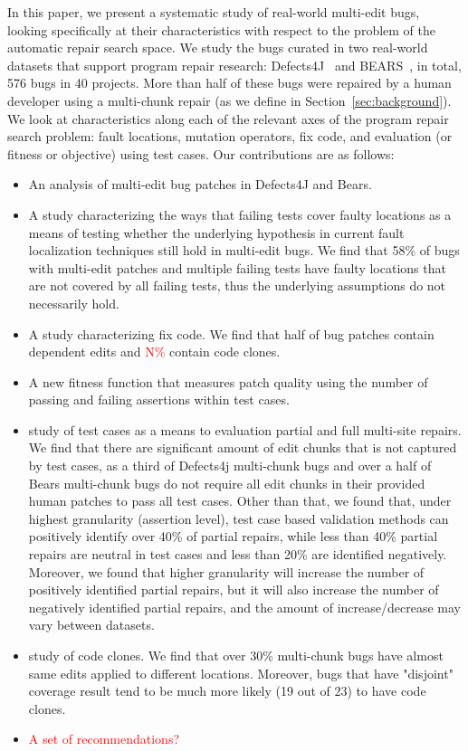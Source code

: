 \documentclass[sigconf, timestamp-false, anonymous=true]{acmart}
\newcommand\todo[1]{\textcolor{red}{#1}}
\begin{document}
In this paper, we present a systematic study of real-world multi-edit bugs,
looking specifically at their characteristics with respect to the problem of the
automatic repair search space.  
We study the bugs curated in two
real-world datasets that support program repair research: Defects4J~\cite{defects4j}
and BEARS~\cite{bears}, in total, 576 bugs in 40 projects. 
More than half of these bugs were repaired by a
human developer using a multi-chunk repair (as we define in
Section~\ref{sec:background}).  We look at characteristics along each of the
relevant axes of the program repair search problem: fault locations, mutation
operators, fix code, and evaluation (or fitness or objective) using test cases.  Our 
contributions are
as follows:

\begin{itemize}
\item An analysis of multi-edit bug patches in Defects4J and Bears.
\item A study characterizing the ways that failing tests cover faulty locations as a means of 
testing whether the underlying hypothesis in current fault localization techniques still hold 
in multi-edit bugs. We find that 58\% of 
bugs with multi-edit patches and multiple failing tests have faulty locations that are not 
covered by all failing tests, thus the underlying assumptions do not necessarily hold.
\item A study characterizing fix code.  We find that half of 
bug patches contain dependent edits and \todo{N\%} contain 
code clones.
\item A new fitness function that measures patch quality using the number of 
	passing and failing assertions within test cases.
\item study of test cases as a means to evaluation partial and full
  multi-site repairs.  We find that there are significant amount of edit chunks that
  is not captured by test cases, as a third of Defects4j multi-chunk bugs and over a half of 
  Bears multi-chunk bugs do not require all edit chunks in their provided human patches to
  pass all test cases. Other than that, we found that, under highest granularity (assertion level), test case
  based validation methods can positively identify over 40\% of partial repairs, 
  while less than 40\% partial repairs are neutral in test cases and less than 20\% are identified
  negatively. Moreover, we found that higher granularity will increase the number of
  positively identified partial repairs, but it will also increase the number of negatively 
  identified partial repairs, and the amount of increase/decrease may vary between
  datasets.
\item  study of code clones. We find that over 30\% multi-chunk bugs
  have almost same edits applied to different locations. Moreover, bugs that have 
  "disjoint" coverage result tend to be much more likely (19 out of 23) to have
  code clones.
\item \todo{A set of recommendations?}
\end{itemize}
\end{document}
